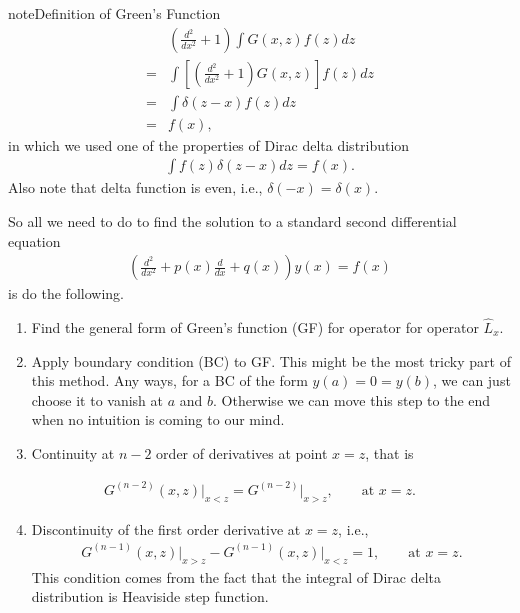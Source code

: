 \documentclass[letterpaper,10pt,english]{sphinxmanual}
\begin{document}
\begin{sphinxadmonition}{note}{Definition of Green’s Function}
\begin{equation*}
\begin{split}& \left(\frac{d^2}{dx^2} +1 \right) \int G(x,z) f(z) dz \\
=& \int \left[ \left(\frac{d^2}{dx^2} +1 \right) G(x,z) \right] f(z) dz \\
=& \int \delta(z-x) f(z) dz \\
=& f(x),\end{split}
\end{equation*}
in which we used one of the properties of Dirac delta distribution
\begin{equation*}
\begin{split}\int f(z) \delta(z-x) dz = f(x).\end{split}
\end{equation*}
Also note that delta function is even, i.e., \(\delta(-x) = \delta(x)\).

So all we need to do to find the solution to a standard second differential equation
\begin{equation*}
\begin{split}\left( \frac{d^2}{dx^2} + p(x) \frac{d}{dx} + q(x) \right)y(x) = f(x)\end{split}
\end{equation*}
is do the following.
\begin{enumerate}
\item {} 
Find the general form of Green’s function (GF) for operator for operator \(\hat L_x\).

\item {} 
Apply boundary condition (BC) to GF. This might be the most tricky part of this method. Any ways, for a BC of the form \(y(a)=0=y(b)\), we can just choose it to vanish at \(a\) and \(b\). Otherwise we can move this step to the end when no intuition is coming to our mind.

\item {} 
Continuity at \(n-2\) order of derivatives at point \(x=z\), that is

\end{enumerate}
\begin{equation*}
\begin{split}G^{(n-2)}(x,z) \vert_{x<z} = G^{(n-2)} \vert _{x>z} ,\qquad \text{at } x= z.\end{split}
\end{equation*}\begin{enumerate}
\setcounter{enumi}{3}
\item {} 
Discontinuity of the first order derivative at \(x=z\), i.e.,
\begin{equation*}
\begin{split}G^{(n-1)}(x,z)\vert_{x>z} - G^{(n-1)}(x,z)\vert_{x<z} = 1, \qquad \text{at } x= z.\end{split}
\end{equation*}
This condition comes from the fact that the integral of Dirac delta distribution is Heaviside step function.


\end{enumerate}
\end{sphinxadmonition}
\end{document}
